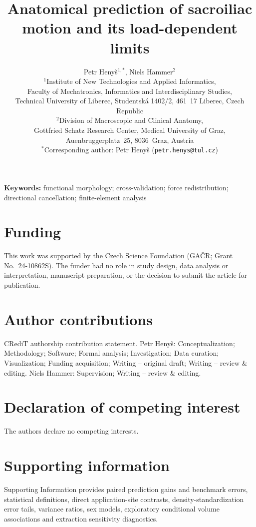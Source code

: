 \documentclass[11pt,a4paper]{article}
\title{Anatomical prediction of sacroiliac motion and its load-dependent limits}
\author{%
Petr Heny\v{s}$^{1,*}$, Niels Hammer$^{2}$\\
\small $^{1}$Institute of New Technologies and Applied Informatics,\\
\small Faculty of Mechatronics, Informatics and Interdisciplinary Studies,\\
\small Technical University of Liberec, Studentsk\'a 1402/2, 461~17 Liberec, Czech Republic\\
\small $^{2}$Division of Macroscopic and Clinical Anatomy,\\
\small Gottfried Schatz Research Center, Medical University of Graz,\\
\small Auenbruggerplatz~25, 8036~Graz, Austria\\
\small $^{*}$Corresponding author: Petr Heny\v{s} (\texttt{petr.henys@tul.cz})%
}
\date{}
\begin{document}
\doublespacing
\begingroup
\singlespacing
\maketitle
\endgroup
\linenumbers

\begin{abstract}

\end{abstract}

\noindent\textbf{Keywords:} functional morphology; cross-validation; force redistribution; directional cancellation; finite-element analysis



\FloatBarrier

\FloatBarrier





\section*{Funding}
This work was supported by the Czech Science Foundation (GA\v{C}R; Grant No.\ 24-10862S). The funder had no role in study design, data analysis or interpretation, manuscript preparation, or the decision to submit the article for publication.

\section*{Author contributions}
CRediT authorship contribution statement. Petr Heny\v{s}: Conceptualization; Methodology; Software; Formal analysis; Investigation; Data curation; Visualization; Funding acquisition; Writing -- original draft; Writing -- review \& editing. Niels Hammer: Supervision; Writing -- review \& editing.

\section*{Declaration of competing interest}
The authors declare no competing interests.

\section*{Supporting information}
Supporting Information provides paired prediction gains and benchmark errors, statistical definitions, direct application-site contrasts, density-standardization error tails, variance ratios, sex models, exploratory conditional volume associations and extraction sensitivity diagnostics.
\end{document}
